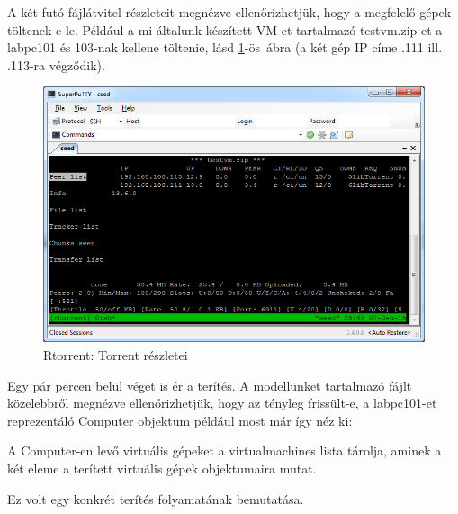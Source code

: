 A két futó fájlátvitel részleteit megnézve ellenőrizhetjük, hogy a megfelelő gépek töltenek-e le. Például a mi általunk készített VM-et tartalmazó testvm.zip-et a labpc101 és 103-nak kellene töltenie, lásd \ref{fig:seed_peers}-ös~ábra (a két gép IP címe .111 ill. .113-ra végződik).

\begin{figure}[ht]
\centering
\includegraphics[width=140mm, keepaspectratio]{figures/test_seed_peers.png}
\caption{Rtorrent: Torrent részletei}
\label{fig:seed_peers}
\end{figure}

Egy pár percen belül véget is ér a terítés. A modellünket tartalmazó fájlt közelebbről megnézve ellenőrizhetjük, hogy az tényleg frissült-e, a labpc101-et reprezentáló Computer objektum például most már így néz ki:


A Computer-en levő virtuális gépeket a virtualmachines lista tárolja, aminek a két eleme a terített virtuális gépek objektumaira mutat.

Ez volt egy konkrét terítés folyamatának bemutatása.
